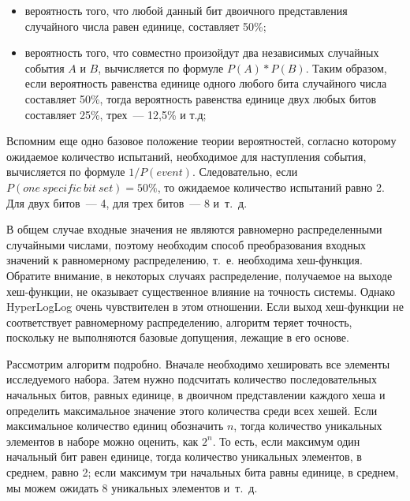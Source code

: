 \begin{itemize}
  \item вероятность того, что любой данный бит двоичного представления случайного числа равен единице, составляет 50\%;
  \item вероятность того, что совместно произойдут два независимых случайных события $A$ и $B$, вычисляется по формуле $P(A)*P(B)$. Таким образом, если вероятность равенства единице одного любого бита случайного числа составляет 50\%, тогда вероятность равенства единице двух любых битов составляет 25\%, трех~--- 12,5\% и т.д;
\end{itemize}

Вспомним еще одно базовое положение теории вероятностей, согласно которому ожидаемое количество испытаний, необходимое для наступления события, вычисляется по формуле $1/P(event)$. Следовательно, если $P(one\ specific\ bit\ set) = 50\%$, то ожидаемое количество испытаний равно 2. Для двух битов~--- 4, для трех битов~--- 8 и~т.~д.

В общем случае входные значения не являются равномерно распределенными случайными числами, поэтому необходим способ преобразования входных значений к равномерному распределению, т.~е. необходима хеш-функция. Обратите внимание, в некоторых случаях распределение, получаемое на выходе хеш-функции, не оказывает существенное влияние на точность системы. Однако HyperLogLog очень чувствителен в этом отношении. Если выход хеш-функции не соответствует равномерному распределению, алгоритм теряет точность, поскольку не выполняются базовые допущения, лежащие в его основе.

Рассмотрим алгоритм подробно. Вначале необходимо хешировать все элементы исследуемого набора. Затем нужно подсчитать количество последовательных начальных битов, равных единице, в двоичном представлении каждого хеша и определить максимальное значение этого количества среди всех хешей. Если максимальное количество единиц обозначить $n$, тогда количество уникальных элементов в наборе можно оценить, как $2^n$. То есть, если максимум один начальный бит равен единице, тогда количество уникальных элементов, в среднем, равно 2; если максимум три начальных бита равны единице, в среднем, мы можем ожидать 8 уникальных элементов и~т.~д.

